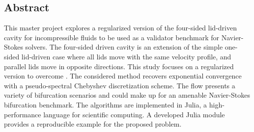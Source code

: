 
\begin{center}
\section*{Abstract}
\end{center} 

This master project explores a regularized version of the four-sided lid-driven
cavity for incompressible fluids to be used as a validator benchmark for
Navier-Stokes solvers. The four-sided driven cavity is an extension of the
simple one-sided lid-driven case where all lids move with the same velocity
profile, and parallel lids move in opposite directions. This study focuses on a
regularized version to overcome . The considered
method recovers exponential convergence with a pseudo-spectral Chebyshev
discretization scheme. The flow presents a variety of bifurcation scenarios and
could make up for an amenable Navier-Stokes bifurcation benchmark. The
algorithms are implemented in Julia, a high-performance language for scientific
computing. A developed Julia module provides a reproducible example for the
proposed problem.
